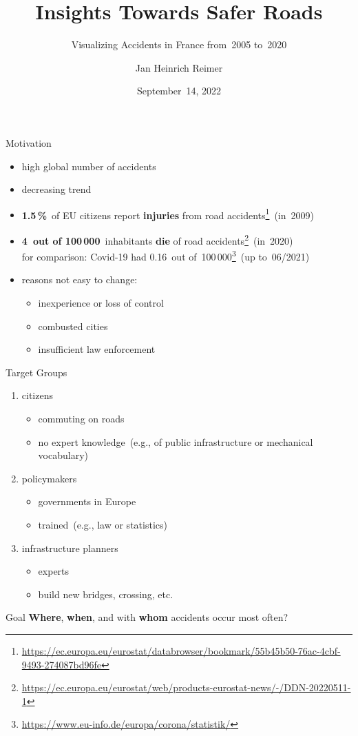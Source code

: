 \documentclass[english]{mlutalk}
\title{Insights Towards Safer Roads}
\subtitle{Visualizing Accidents in France from~2005 to~2020}
\author{Jan Heinrich Reimer}
\institute{Martin Luther University Halle-Wittenberg\\Information Retrieval und Visualisierung}
\date{September~14, 2022}
\renewcommand{\emph}[1]{\textbf{#1}}
\begin{document}
\titleframe

\begin{frame}{Motivation}
  \begin{itemize}
    \item high global number of accidents~\cite{Who2015}
    \item decreasing trend
    \item \emph{1.5\,\%}~of EU citizens report \emph{injuries} from road accidents\footnote{\tiny\url{https://ec.europa.eu/eurostat/databrowser/bookmark/55b45b50-76ac-4cbf-9493-274087bd96fe}}~(in~2009)
    \item \emph{4~out of 100\,000}~inhabitants \emph{die} of road accidents\footnote{\tiny\url{https://ec.europa.eu/eurostat/web/products-eurostat-news/-/DDN-20220511-1}}~(in~2020) \\
    {\scriptsize for comparison: Covid-19 had 0.16~out of~100\,000\footnote{\tiny\url{https://www.eu-info.de/europa/corona/statistik/}}~(up to~06/2021)}
    \item reasons not easy to change:
    \begin{itemize}
      \item inexperience or loss of control~\cite{RolisonRMF2018}
      \item combusted cities~\cite{AlbalateF2021}
      \item insufficient law enforcement~\cite{Who2015}
    \end{itemize}
  \end{itemize}
\end{frame}

\begin{frame}{Target Groups}
  \begin{enumerate}
    \item {\large citizens}
    \begin{itemize}
      \item commuting on roads
      \item no expert knowledge~(e.g., of public infrastructure or mechanical vocabulary)
    \end{itemize}
    \item {\large policymakers}
    \begin{itemize}
      \item governments in Europe
      \item trained~(e.g., law or statistics)
    \end{itemize}
    \item {\large infrastructure planners}
    \begin{itemize}
      \item experts
      \item build new bridges, crossing, etc.
    \end{itemize}
  \end{enumerate}
  \begin{block}{Goal}
    \emph{Where}, \emph{when}, and with \emph{whom} accidents occur most often?
  \end{block}
\end{frame}
\end{document}

